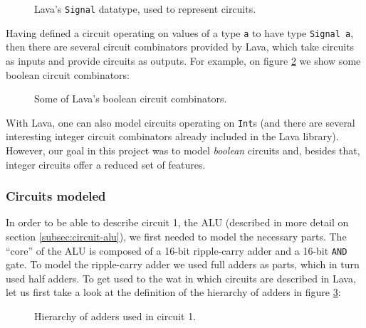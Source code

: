\documentclass[a4paper]{article}
\begin{document}
            \begin{figure}[h!]
                \begin{center}
                \end{center}
                \caption{Lava's \texttt{Signal} datatype, used to represent circuits.
                    \label{fig:lava-signal}}
            \end{figure}

            Having defined a circuit operating on values of a type \texttt{a} to have type
            \texttt{Signal a}, then there are several circuit combinators provided by Lava, which
            take circuits as inputs and provide circuits as outputs. For example, on figure
            \ref{fig:lava-boolean-combinators} we show some boolean circuit combinators:

            \begin{figure}[h!]
                \begin{center}
                \end{center}
                \caption{Some of Lava's boolean circuit combinators.
                    \label{fig:lava-boolean-combinators}}
            \end{figure}

            With Lava, one can also model circuits operating on \texttt{Int}s (and there are several
            interesting integer circuit combinators already included in the Lava library). However,
            our goal in this project was to model \emph{boolean} circuits and, besides that, integer
            circuits offer a reduced set of features.


            \subsubsection{Circuits modeled}
            \label{subsubsec:lava-circuits}
                In order to be able to describe circuit 1, the ALU (described in more detail on
                section \ref{subsec:circuit-alu}), we first needed to model the necessary
                parts. The ``core'' of the ALU is composed of a 16-bit ripple-carry adder and
                a 16-bit \texttt{AND} gate. To model the ripple-carry adder we used full adders as
                parts, which in turn used half adders. To get used to the wat in which
                circuits are described in Lava, let us first take a look at the definition of the
                hierarchy of adders in figure \ref{fig:lava-circuit1-model-adders}:
                \begin{figure}[h!]
                    \begin{center}
                    \end{center}
                    \caption{Hierarchy of adders used in circuit 1.
                        \label{fig:lava-circuit1-model-adders}}
                \end{figure}
\end{document}
